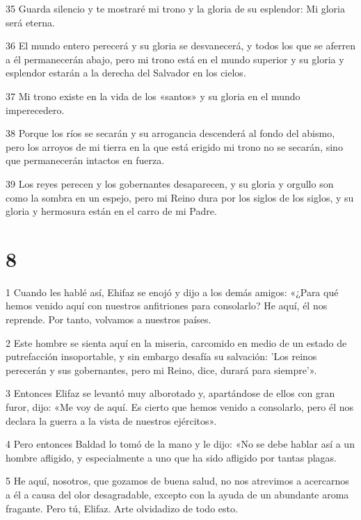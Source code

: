 \par 35 Guarda silencio y te mostraré mi trono y la gloria de su esplendor: Mi gloria será eterna.

\par 36 El mundo entero perecerá y su gloria se desvanecerá, y todos los que se aferren a él permanecerán abajo, pero mi trono está en el mundo superior y su gloria y esplendor estarán a la derecha del Salvador en los cielos.

\par 37 Mi trono existe en la vida de los «santos» y su gloria en el mundo imperecedero.

\par 38 Porque los ríos se secarán y su arrogancia descenderá al fondo del abismo, pero los arroyos de mi tierra en la que está erigido mi trono no se secarán, sino que permanecerán intactos en fuerza.

\par 39 Los reyes perecen y los gobernantes desaparecen, y su gloria y orgullo son como la sombra en un espejo, pero mi Reino dura por los siglos de los siglos, y su gloria y hermosura están en el carro de mi Padre.

\chapter{8}

\par 1 Cuando les hablé así, Ehifaz se enojó y dijo a los demás amigos: «¿Para qué hemos venido aquí con nuestros anfitriones para consolarlo? He aquí, él nos reprende. Por tanto, volvamos a nuestros países.

\par 2 Este hombre se sienta aquí en la miseria, carcomido en medio de un estado de putrefacción insoportable, y sin embargo desafía su salvación: 'Los reinos perecerán y sus gobernantes, pero mi Reino, dice, durará para siempre'».

\par 3 Entonces Elifaz se levantó muy alborotado y, apartándose de ellos con gran furor, dijo: «Me voy de aquí. Es cierto que hemos venido a consolarlo, pero él nos declara la guerra a la vista de nuestros ejércitos».

\par 4 Pero entonces Baldad lo tomó de la mano y le dijo: «No se debe hablar así a un hombre afligido, y especialmente a uno que ha sido afligido por tantas plagas.

\par 5 He aquí, nosotros, que gozamos de buena salud, no nos atrevimos a acercarnos a él a causa del olor desagradable, excepto con la ayuda de un abundante aroma fragante. Pero tú, Elifaz. Arte olvidadizo de todo esto.

